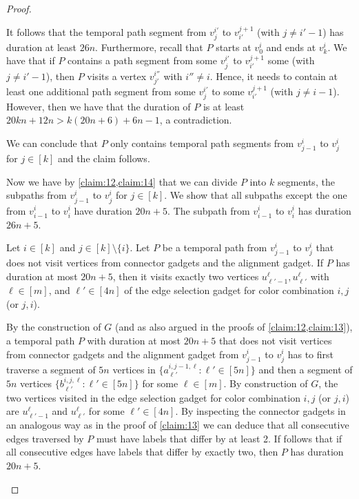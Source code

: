 \documentclass[a4paper,UKenglish,cleveref, autoref, thm-restate]{lipics-v2021}
\begin{document}
\begin{proof}
\begin{claimproof}
It follows that the temporal path segment from $v^{i'}_j$ to $v^{j+1}_{i'}$ (with $j\neq i'-1$) has duration at least $26n$.
Furthermore, recall that $P$ starts at $v^i_0$ and ends at $v^i_k$. We have that if $P$ contains a path segment from some $v^{i'}_j$ to $v^{j+1}_{i'}$ some (with $j\neq i'-1$), then $P$ visits a vertex $v^{i''}_{j'}$ with $i''\neq i$. Hence, it needs to contain at least one additional path segment from some $v^{i'}_j$ to some $v^{j+1}_{i'}$ (with $j\neq i-1$). However, then we have that the duration of $P$ is at least $20kn+12n>k(20n+6)+6n-1$, a contradiction.

We can conclude that $P$ only contains temporal path segments from $v^{i}_{j-1}$ to $v^i_{j}$ for $j\in[k]$ and the claim follows.
%
    \end{claimproof}

Now we have by \cref{claim:12,claim:14} that we can divide $P$ into $k$ segments, the subpaths from $v^i_{j-1}$ to $v^i_j$ for $j\in [k]$. We show that all subpaths except the one from $v_{i-1}^i$ to $v_i^i$ have duration $20n+5$. The subpath from $v_{i-1}^i$ to $v_i^i$ has duration $26n+5$.

\begin{claim}\label{claim:15}
    Let $i\in[k]$ and $j\in[k]\setminus\{i\}$. Let $P$ be a temporal path from $v_{j-1}^i$ to $v_j^i$ that does not visit vertices from connector gadgets and the alignment gadget. If $P$ has duration at most $20n+5$, then it visits exactly two vertices $u^\ell_{\ell'-1},u^\ell_{\ell'}$ with $\ell\in[m]$, and $\ell'\in[4n]$ of the edge selection gadget for color combination $i,j$ (or $j,i$).
\end{claim}
\begin{claimproof}
    By the construction of $G$ (and as also argued in the proofs of \cref{claim:12,claim:13}), a temporal path $P$ with duration at most $20n+5$ that does not visit vertices from connector gadgets and the alignment gadget from $v_{j-1}^i$ to $v_j^i$ has to first traverse a segment of $5n$ vertices in $\{a^{i,j-1,\ell}_{\ell'} :  \ell'\in[5n]\}$ and then a segment of $5n$ vertices $\{b^{i,j,\ell}_{\ell'} :  \ell'\in[5n]\}$ for some $\ell\in[m]$. By construction of $G$, the two vertices visited in the edge selection gadget for color combination $i,j$ (or $j,i$) are $u^\ell_{\ell'-1}$ and $u^\ell_{\ell'}$ for some $\ell'\in[4n]$. By inspecting the connector gadgets in an analogous way as in the proof of \cref{claim:13} we can deduce that all consecutive edges traversed by $P$ must have labels that differ by at least 2. If follows that if all consecutive edges have labels that differ by exactly two, then $P$ has duration $20n+5$.
\end{claimproof}


\end{proof}
\end{document}
